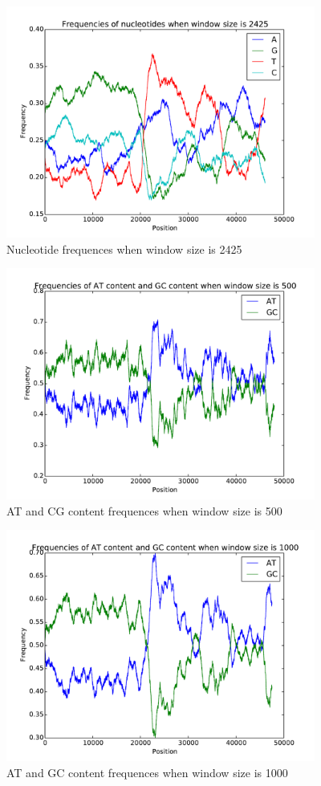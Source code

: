 \documentclass{acm_proc_article-sp}
\begin{document}
\begin{figure}[t]
	\includegraphics[width=4in]{nuc-window-2425.pdf}
	\caption{Nucleotide frequences when window size is 2425}
	\label{fig:n2425}
\end{figure}
\begin{figure}[t]
	\includegraphics[width=4in]{dinuc-window-500.pdf}
	\caption{AT and CG content frequences when window size is 500}
	\label{fig:dn500}
\end{figure}
\begin{figure}[t]
	\includegraphics[width=4in]{dinuc-window-1000.pdf}
	\caption{AT and GC content frequences when window size is 1000}
	\label{fig:dn1000}
\end{figure}
\end{document}
